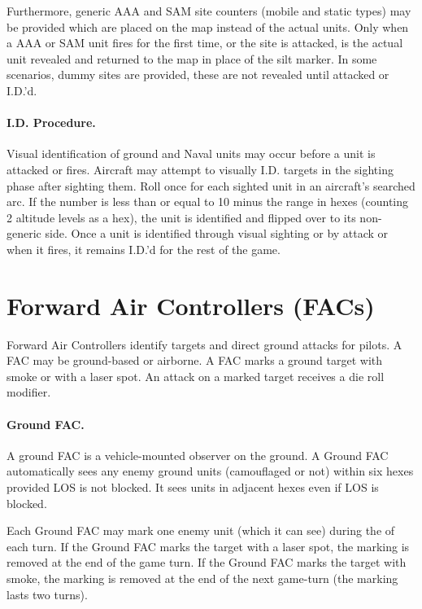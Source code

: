 \begin{advancedrules}
Furthermore, generic AAA and SAM site counters (mobile and static types) may be provided which are placed on the map instead of the actual units. Only when a AAA or SAM unit fires for the first time, or the site is attacked, is the actual unit revealed and returned to the map in place of the silt marker. In some scenarios, dummy sites are provided, these are not revealed until attacked or I.D.'d.

\paragraph{I.D. Procedure.} Visual identification of ground and Naval units may occur before a unit is attacked or fires. Aircraft may attempt to visually I.D. targets in the sighting phase after sighting them. Roll once for each sighted unit in an aircraft's searched arc. If the number is less than or equal to 10 minus the range in hexes (counting 2 altitude levels as a hex), the unit is identified and flipped over to its non-generic side. Once a unit is identified through visual sighting or by attack or when it fires, it remains I.D.'d for the rest of the game.

\section{Forward Air Controllers (FACs)}
\label{rule:sighting-facs}

Forward Air Controllers identify targets and direct ground attacks for pilots. A FAC may be ground-based or airborne. A FAC marks a ground target with smoke or with a laser spot. An attack on a marked target receives a  die roll modifier.

\paragraph{Ground FAC.} A ground FAC is a vehicle-mounted observer on the ground. A Ground FAC automatically sees any enemy ground units (camouflaged or not) within six hexes provided LOS is not blocked. It sees units in adjacent hexes even if LOS is blocked.

Each Ground FAC may mark one enemy unit (which it can see) during the  of each turn. If the Ground FAC marks the target with a laser spot, the marking is removed at the end of the game turn. If the Ground FAC marks the target with smoke, the marking is removed at the end of the next game-turn (the marking lasts two turns).


\end{advancedrules}
